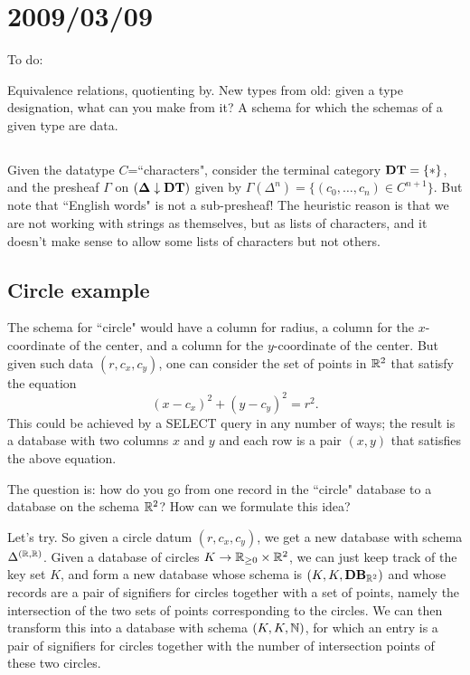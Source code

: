 \documentclass{amsart}
\def\DT{{\bf DT}}
\def\bD{{\bf \Delta}}
\def\down{\downarrow}
\begin{document}
\section{2009/03/09}

To do:

Equivalence relations, quotienting by.
New types from old: given a type designation, what can you make from it?
A schema for which the schemas of a given type are data.

\subsection{}

Given the datatype $C$=``characters", consider the terminal category $\DT=\{*\}$, and the presheaf $\Gamma$ on $(\bD\down\DT)$ given by $\Gamma(\Delta^n)=\{(c_0,\ldots,c_n)\in C^{n+1}\}$.  But note that ``English words" is not a sub-presheaf!  The heuristic reason is that we are not working with strings as themselves, but as lists of characters, and it doesn't make sense to allow some lists of characters but not others.

\subsection{Circle example}

The schema for ``circle" would have a column for radius, a column for the $x$-coordinate of the center, and a column for the $y$-coordinate of the center.  But given such data $(r,c_x,c_y)$, one can consider the set of points in ${\mathbb R}^2$ that satisfy the equation $$(x-c_x)^2+(y-c_y)^2=r^2.$$  This could be achieved by  a SELECT query in any number of ways; the result is a database with two columns $x$ and $y$ and each row is a pair $(x,y)$ that satisfies the above equation.  

The question is: how do you go from one record in the ``circle" database to a database on the schema ${\mathbb R}^2$?  How can we formulate this idea?

Let's try.  So given a circle datum $(r,c_x,c_y)$, we get a new database with schema $\Delta^{({\mathbb R},{\mathbb R})}$.  Given a database of circles $K\rightarrow{\mathbb R}_{\geq 0}\times{\mathbb R}^2$, we can just keep track of the key set $K$, and form a new database whose schema is $(K,K,{\bf DB}_{{\mathbb R}^2})$ and whose records are a pair of signifiers for circles together with a set of points, namely the intersection of the two sets of points corresponding to the circles.  We can then transform this into a database with schema $(K,K,{\mathbb N})$, for which an entry is a pair of signifiers for circles together with the number of intersection points of these two circles.
\end{document}
